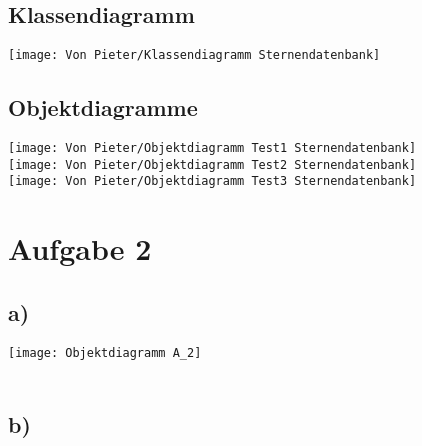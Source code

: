 \documentclass[12pt,a4paper,oneside,ngerman]{article}
\begin{document}
		\subsection{Klassendiagramm}
		\texttt{[image: Von Pieter/Klassendiagramm Sternendatenbank]}
		\subsection{Objektdiagramme}
		\texttt{[image: Von Pieter/Objektdiagramm Test1 Sternendatenbank]}\\ 
		\texttt{[image: Von Pieter/Objektdiagramm Test2 Sternendatenbank]}\\
		\texttt{[image: Von Pieter/Objektdiagramm Test3 Sternendatenbank]}\\

	
    \section{Aufgabe 2}
        \subsection{a)}
            \texttt{[image: Objektdiagramm A\_2]}\\\\
        \subsection{b)}
\end{document}
